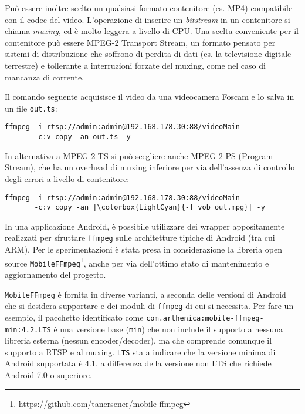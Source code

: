 Può essere inoltre scelto un qualsiasi formato contenitore (es. MP4) compatibile con il codec del video. L'operazione di inserire un \emph{bitstream} in un contenitore si chiama \emph{muxing}, ed è molto leggera a livello di CPU. Una scelta conveniente per il contenitore può essere MPEG-2 Transport Stream, un formato pensato per sistemi di distribuzione che soffrono di perdita di dati (es. la televisione digitale terrestre) e tollerante a interruzioni forzate del muxing, come nel caso di mancanza di corrente.

Il comando seguente acquisisce il video da una videocamera Foscam e lo salva in un file \texttt{out.ts}:

\begin{verbatim}
ffmpeg -i rtsp://admin:admin@192.168.178.30:88/videoMain
       -c:v copy -an out.ts -y
\end{verbatim}

In alternativa a MPEG-2 TS si può scegliere anche MPEG-2 PS (Program Stream), che ha un overhead di muxing inferiore per via dell'assenza di controllo degli errori a livello di contenitore:

\begin{verbatim}
ffmpeg -i rtsp://admin:admin@192.168.178.30:88/videoMain
       -c:v copy -an |\colorbox{LightCyan}{-f vob out.mpg}| -y
\end{verbatim}

In una applicazione Android, è possibile utilizzare dei wrapper appositamente realizzati per sfruttare \texttt{ffmpeg} sulle architetture tipiche di Android (tra cui ARM). Per le sperimentazioni è stata presa in considerazione la libreria open source \texttt{MobileFFmpeg}\footnote{https://github.com/tanersener/mobile-ffmpeg}, anche per via dell'ottimo stato di mantenimento e aggiornamento del progetto.

\texttt{MobileFFmpeg} è fornita in diverse varianti, a seconda delle versioni di Android che si desidera supportare e dei moduli di \texttt{ffmpeg} di cui si necessita. Per fare un esempio, il pacchetto identificato come \texttt{com.arthenica:mobile-ffmpeg-min:4.2.LTS} è una versione base (\texttt{min}) che non include il supporto a nessuna libreria esterna (nessun encoder/decoder), ma che comprende comunque il supporto a RTSP e al muxing. \texttt{LTS} sta a indicare che la versione minima di Android supportata è 4.1, a differenza della versione non LTS che richiede Android 7.0 o superiore.


